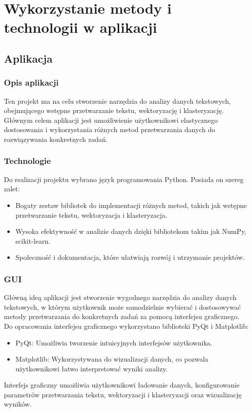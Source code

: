 \chapter{Wykorzystanie metody i technologii w aplikacji}
	
		
\section{Aplikacja}

	\subsection{Opis aplikacji}
		Ten projekt ma na celu stworzenie narzędzia do analizy danych tekstowych, obejmującego wstępne przetwarzanie tekstu, wektoryzację i klasteryzację. Głównym celem aplikacji jest umożliwienie użytkownikowi elastycznego dostosowania i wykorzystania różnych metod przetwarzania danych do rozwiązywania konkretnych zadań.
		
		
	\subsection{Technologie}
		Do realizacji projektu wybrano język programowania Python. Posiada on szereg zalet:
		\begin{itemize}
			\item Bogaty zestaw bibliotek do implementacji różnych metod, takich jak wstępne przetwarzanie tekstu, wektoryzacja i klasteryzacja.
			\item Wysoka efektywność w analizie danych dzięki bibliotekom takim jak NumPy, scikit-learn.
			\item Społeczność i dokumentacja, które ułatwiają rozwój i utrzymanie projektów.
		\end{itemize}
		
		
	\subsection{GUI}
		Główną ideą aplikacji jest stworzenie wygodnego narzędzia do analizy danych tekstowych, w którym użytkownik może samodzielnie wybierać i dostosowywać metody przetwarzania do konkretnych zadań za pomocą interfejsu graficznego. Do opracowania interfejsu graficznego wykorzystano biblioteki PyQt i Matplotlib:
		\begin{itemize}
			\item PyQt: Umożliwia tworzenie intuicyjnych interfejsów użytkownika.
			\item Matplotlib: Wykorzystywana do wizualizacji danych, co pozwala użytkownikowi łatwo interpretować wyniki analizy.
		\end{itemize}
		Interfejs graficzny umożliwia użytkownikowi ładowanie danych, konfigurowanie parametrów przetwarzania tekstu, wektoryzacji i klasteryzacji oraz wizualizację wyników.
		
